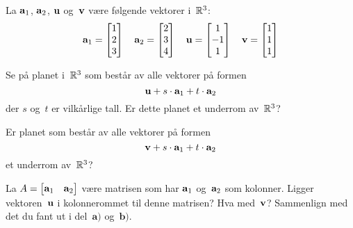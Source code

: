 \begin{oppgave}
La $\mathbf{a}_1$, $\mathbf{a}_2$, $\mathbf{u}$ og~$\mathbf{v}$ være følgende vektorer i~$\mathbb{R}^3$:
\[
\mathbf{a}_1 = \begin{bmatrix} 1 \\ 2 \\ 3 \end{bmatrix}
\quad
\mathbf{a}_2 = \begin{bmatrix} 2 \\ 3 \\ 4 \end{bmatrix}
\quad
\mathbf{u} = \begin{bmatrix} 1 \\ -1 \\ 1 \end{bmatrix}
\quad
\mathbf{v} = \begin{bmatrix} 1 \\ 1 \\ 1 \end{bmatrix}
\]
\begin{punkt}
Se på planet i~$\mathbb{R}^3$ som består av alle vektorer på formen
\[
\mathbf{u} + s \cdot \mathbf{a}_1 + t \cdot \mathbf{a}_2
\]
der $s$ og~$t$ er vilkårlige tall.  Er dette planet et underrom
av~$\mathbb{R}^3$?
\end{punkt}
\begin{punkt}
Er planet som består av alle vektorer på formen
\[
\mathbf{v} + s \cdot \mathbf{a}_1 + t \cdot \mathbf{a}_2
\]
et underrom av~$\mathbb{R}^3$?
\end{punkt}
\begin{punkt}
La $A = \begin{bmatrix} \mathbf{a}_1 & \mathbf{a}_2 \end{bmatrix}$
være matrisen som har $\mathbf{a}_1$ og~$\mathbf{a}_2$ som kolonner.
Ligger vektoren~$\mathbf{u}$ i kolonnerommet til denne matrisen?
Hva med~$\mathbf{v}$?
Sammenlign med det du fant ut i del~$\textbf{a)}$ og~$\textbf{b)}$.
\end{punkt}
\end{oppgave}

